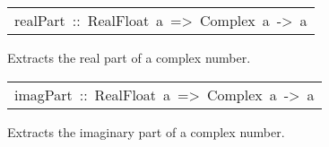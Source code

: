 \begin{haddockdesc}
\item[\begin{tabular}{@{}l}
realPart\ ::\ RealFloat\ a\ =>\ Complex\ a\ ->\ a
\end{tabular}]\haddockbegindoc
Extracts the real part of a complex number.
\par

\end{haddockdesc}
\begin{haddockdesc}
\item[\begin{tabular}{@{}l}
imagPart\ ::\ RealFloat\ a\ =>\ Complex\ a\ ->\ a
\end{tabular}]\haddockbegindoc
Extracts the imaginary part of a complex number.
\par

\end{haddockdesc}
